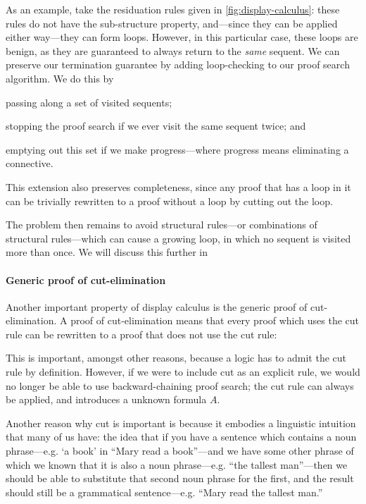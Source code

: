 \documentclass[a4paper]{article}
\begin{document}
As an example, take the residuation rules given in
\autoref{fig:display-calculus}: these rules do not have the
sub-structure property, and---since they can be applied either
way---they can form loops.
However, in this particular case, these loops are benign, as they are
guaranteed to always return to the \emph{same} sequent. We can
preserve our termination guarantee by adding loop-checking to our
proof search algorithm. We do this by
\begin{enumerate*}[label=(\arabic*)]
\item passing along a set of visited sequents;
\item stopping the proof search if we ever visit the same sequent
  twice; and
\item emptying out this set if we make progress---where progress means
  eliminating a connective.
\end{enumerate*}
This extension also preserves completeness, since any proof that has a
loop in it can be trivially rewritten to a proof without a loop by
cutting out the loop.

The problem then remains to avoid structural rules---or combinations
of structural rules---which can cause a growing loop, in which no
sequent is visited more than once. We will discuss this further in

\paragraph{Generic proof of cut-elimination}
Another important property of display calculus is the generic proof of
cut-elimination.
A proof of cut-elimination means that every proof which uses the cut
rule can be rewritten to a proof that does not use the cut rule:
\begin{prooftree}
\end{prooftree}
This is important, amongst other reasons, because a logic has to admit
the cut rule by definition. However, if we were to include cut as an
explicit rule, we would no longer be able to use backward-chaining
proof search; the cut rule can always be applied, and introduces a
unknown formula $A$.

Another reason why cut is important is because it embodies a
linguistic intuition that many of us have: the idea that if you have a
sentence which contains a noun phrase---e.g. `a book' in ``Mary read
a book''---and we have some other phrase of which we known that it is
also a noun phrase---e.g. ``the tallest man''---then we should be
able to substitute that second noun phrase for the first, and the
result should still be a grammatical sentence---e.g. ``Mary read the
tallest man.''
\end{document}
